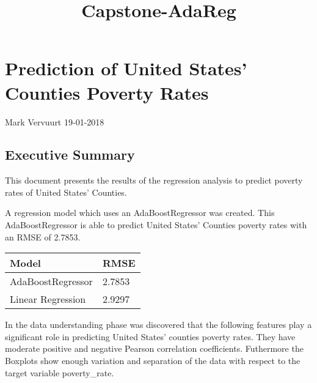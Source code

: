 \documentclass[11pt]{article}
\title{Capstone-AdaReg}
\begin{document}
    
    
    \maketitle
    
    

    
    \section{Prediction of United States' Counties Poverty
Rates}\label{prediction-of-united-states-counties-poverty-rates}

Mark Vervuurt 19-01-2018

\subsection{Executive Summary}\label{executive-summary}

This document presents the results of the regression analysis to predict
poverty rates of United States' Counties.

A regression model which uses an AdaBoostRegressor was created. This
AdaBoostRegressor is able to predict United States' Counties poverty
rates with an RMSE of 2.7853.

\begin{longtable}[]{@{}ll@{}}
\toprule
Model & RMSE\tabularnewline
\midrule
\endhead
AdaBoostRegressor & 2.7853\tabularnewline
Linear Regression & 2.9297\tabularnewline
\bottomrule
\end{longtable}

In the data understanding phase was discovered that the following
features play a significant role in predicting United States' counties
poverty rates. They have moderate positive and negative Pearson
correlation coefficients. Futhermore the Boxplots show enough variation
and separation of the data with respect to the target variable
poverty\_rate.
\end{document}
